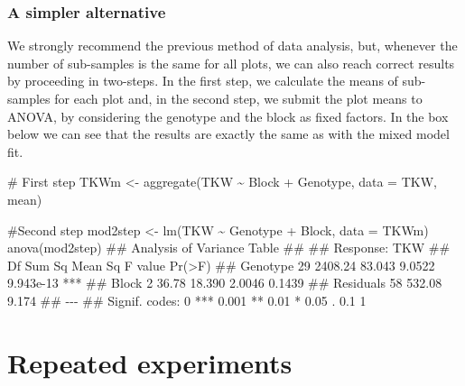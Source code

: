 \documentclass[a4paper,12pt,oneside]{book}
\newenvironment{Shaded}{\begin{snugshade}}{\end{snugshade}}
\newcommand{\SpecialCharTok}[1]{#1}
\newcommand{\CommentTok}[1]{#1}
\newcommand{\DocumentationTok}[1]{#1}
\newcommand{\OtherTok}[1]{#1}
\newcommand{\FunctionTok}[1]{#1}
\newcommand{\AttributeTok}[1]{#1}
\newcommand{\NormalTok}[1]{#1}
\begin{document}
\hypertarget{a-simpler-alternative}{%
\subsubsection{A simpler alternative}\label{a-simpler-alternative}}

We strongly recommend the previous method of data analysis, but, whenever the number of sub-samples is the same for all plots, we can also reach correct results by proceeding in two-steps. In the first step, we calculate the means of sub-samples for each plot and, in the second step, we submit the plot means to ANOVA, by considering the genotype and the block as fixed factors. In the box below we can see that the results are exactly the same as with the mixed model fit.

\begin{Shaded}
\begin{Highlighting}[]
\CommentTok{\# First step}
\NormalTok{TKWm }\OtherTok{\textless{}{-}} \FunctionTok{aggregate}\NormalTok{(TKW }\SpecialCharTok{\textasciitilde{}}\NormalTok{ Block }\SpecialCharTok{+}\NormalTok{ Genotype, }\AttributeTok{data =}\NormalTok{ TKW, mean)}

\CommentTok{\#Second step}
\NormalTok{mod2step }\OtherTok{\textless{}{-}} \FunctionTok{lm}\NormalTok{(TKW }\SpecialCharTok{\textasciitilde{}}\NormalTok{ Genotype }\SpecialCharTok{+}\NormalTok{ Block, }\AttributeTok{data =}\NormalTok{ TKWm)}
\FunctionTok{anova}\NormalTok{(mod2step)}
\DocumentationTok{\#\# Analysis of Variance Table}
\DocumentationTok{\#\# }
\DocumentationTok{\#\# Response: TKW}
\DocumentationTok{\#\#           Df  Sum Sq Mean Sq F value    Pr(\textgreater{}F)    }
\DocumentationTok{\#\# Genotype  29 2408.24  83.043  9.0522 9.943e{-}13 ***}
\DocumentationTok{\#\# Block      2   36.78  18.390  2.0046    0.1439    }
\DocumentationTok{\#\# Residuals 58  532.08   9.174                      }
\DocumentationTok{\#\# {-}{-}{-}}
\DocumentationTok{\#\# Signif. codes:  0 \textquotesingle{}***\textquotesingle{} 0.001 \textquotesingle{}**\textquotesingle{} 0.01 \textquotesingle{}*\textquotesingle{} 0.05 \textquotesingle{}.\textquotesingle{} 0.1 \textquotesingle{} \textquotesingle{} 1}
\end{Highlighting}
\end{Shaded}

\hypertarget{repeated-experiments}{%
\section{Repeated experiments}\label{repeated-experiments}}
\end{document}
